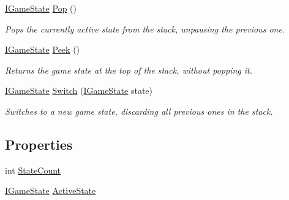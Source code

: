 \begin{DoxyCompactItemize}
\hyperlink{interface_tri_devs_1_1_tri_engine_1_1_state_management_1_1_i_game_state}{I\-Game\-State} \hyperlink{class_tri_devs_1_1_tri_engine_1_1_state_management_1_1_game_state_manager_a050c7850246c6b61f5df226ccb47242d}{Pop} ()
\begin{DoxyCompactList}\small\item\em Pops the currently active state from the stack, unpausing the previous one. \end{DoxyCompactList}\item 
\hyperlink{interface_tri_devs_1_1_tri_engine_1_1_state_management_1_1_i_game_state}{I\-Game\-State} \hyperlink{class_tri_devs_1_1_tri_engine_1_1_state_management_1_1_game_state_manager_ae99e179d4182ad4fba3a3b2105ca6b20}{Peek} ()
\begin{DoxyCompactList}\small\item\em Returns the game state at the top of the stack, without popping it. \end{DoxyCompactList}\item 
\hyperlink{interface_tri_devs_1_1_tri_engine_1_1_state_management_1_1_i_game_state}{I\-Game\-State} \hyperlink{class_tri_devs_1_1_tri_engine_1_1_state_management_1_1_game_state_manager_a8af850bba73f9559ad188bc7195056ac}{Switch} (\hyperlink{interface_tri_devs_1_1_tri_engine_1_1_state_management_1_1_i_game_state}{I\-Game\-State} state)
\begin{DoxyCompactList}\small\item\em Switches to a new game state, discarding all previous ones in the stack. \end{DoxyCompactList}\end{DoxyCompactItemize}
\subsection*{Properties}
\begin{DoxyCompactItemize}
\item 
int \hyperlink{class_tri_devs_1_1_tri_engine_1_1_state_management_1_1_game_state_manager_af2985bcebde75a96311a7bbc64920f5c}{State\-Count}
\item 
\hyperlink{interface_tri_devs_1_1_tri_engine_1_1_state_management_1_1_i_game_state}{I\-Game\-State} \hyperlink{class_tri_devs_1_1_tri_engine_1_1_state_management_1_1_game_state_manager_ac6aa0b66c98f54ff1e15724ad7cc0fb0}{Active\-State}
\end{DoxyCompactItemize}


